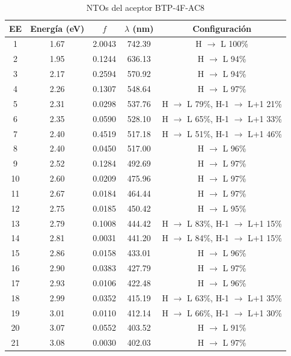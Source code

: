 \begin{table}[H]
\caption{NTOs del aceptor BTP-4F-AC8}
\label{table:R25B-6} \vspace{-0.5cm}
{\footnotesize
\begin{center} 
\begin{tabular}{ccccc}
\hline
EE & Energía (eV) & $f$ & $\lambda$ (nm) & Configuración \\ \hline
1 & 1.67 & 2.0043 & 742.39 & H $\rightarrow$ L 100\% \\
2 & 1.95 & 0.1244 & 636.13 & H $\rightarrow$ L 94\% \\
3 & 2.17 & 0.2594 & 570.92 & H $\rightarrow$ L 94\% \\
4 & 2.26 & 0.1307 & 548.64 & H $\rightarrow$ L 97\% \\
5 & 2.31 & 0.0298 & 537.76 & H $\rightarrow$ L 79\%, H-1 $\rightarrow$ L+1 21\% \\
6 & 2.35 & 0.0590 & 528.10 & H $\rightarrow$ L 65\%, H-1 $\rightarrow$ L+1 33\% \\
7 & 2.40 & 0.4519 & 517.18 & H $\rightarrow$ L 51\%, H-1 $\rightarrow$ L+1 46\% \\
8 & 2.40 & 0.0450 & 517.00 & H $\rightarrow$ L 96\% \\
9 & 2.52 & 0.1284 & 492.69 & H $\rightarrow$ L 97\% \\
10 & 2.60 & 0.0209 & 475.96 & H $\rightarrow$ L 97\% \\
11 & 2.67 & 0.0184 & 464.44 & H $\rightarrow$ L 97\% \\
12 & 2.75 & 0.0185 & 450.42 & H $\rightarrow$ L 95\% \\
13 & 2.79 & 0.1008 & 444.42 & H $\rightarrow$ L 83\%, H-1 $\rightarrow$ L+1 15\% \\
14 & 2.81 & 0.0031 & 441.20 & H $\rightarrow$ L 84\%, H-1 $\rightarrow$ L+1 15\% \\
15 & 2.86 & 0.0158 & 433.01 & H $\rightarrow$ L 96\% \\
16 & 2.90 & 0.0383 & 427.79 & H $\rightarrow$ L 97\% \\
17 & 2.93 & 0.0106 & 422.48 & H $\rightarrow$ L 96\% \\
18 & 2.99 & 0.0352 & 415.19 & H $\rightarrow$ L 63\%, H-1 $\rightarrow$ L+1 35\% \\
19 & 3.01 & 0.0110 & 412.14 & H $\rightarrow$ L 66\%, H-1 $\rightarrow$ L+1 30\% \\
20 & 3.07 & 0.0552 & 403.52 & H $\rightarrow$ L 91\% \\
21 & 3.08 & 0.0030 & 402.03 & H $\rightarrow$ L 97\% \\

\end{tabular}
\end{center}}
\end{table}
